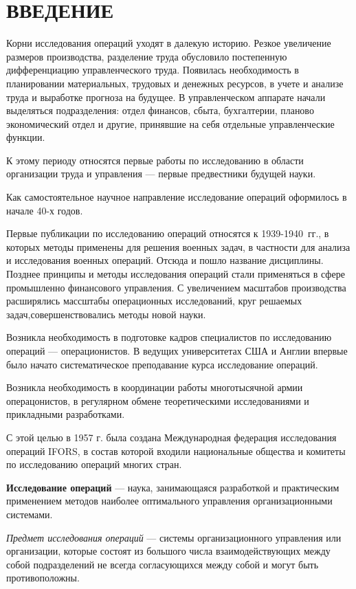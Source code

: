 \section*{ВВЕДЕНИЕ}

Корни исследования операций уходят в далекую историю. Резкое увеличение размеров производства, разделение труда обусловило постепенную дифференциацию управленческого труда. Появилась необходимость в планировании материальных, трудовых и денежных ресурсов, в учете и анализе труда и выработке прогноза на будущее. В управленческом аппарате начали выделяться подразделения: отдел финансов, сбыта, бухгалтерии, планово экономический отдел и другие, принявшие на себя отдельные управленческие функции.

К этому периоду относятся первые работы по исследованию в области
организации труда и управления --- первые предвестники будущей науки.

Как самостоятельное научное направление исследование операций
оформилось в начале 40-х годов.

Первые публикации по исследованию операций относятся к 1939-1940~гг., в
которых методы применены для решения военных задач, в частности для
анализа и исследования военных операций. Отсюда и пошло название
дисциплины. Позднее принципы и методы исследования операций стали
применяться в сфере промышленно финансового управления. С увеличением
масштабов производства расширялись массштабы операционных
исследований, круг решаемых задач,совершенствовались методы новой
науки.

Возникла необходимость в подготовке кадров специалистов по
исследованию операций --- операционистов. В ведущих университетах США и
Англии впервые было начато систематическое преподавание курса
исследование операций.

Возникла необходимость в координации работы многотысячной армии
операцонистов, в регулярном обмене теоретическими исследованиями и
прикладными разработками.

С этой целью в 1957 г. была создана Международная федерация
исследования операций IFORS, в состав которой входили национальные
общества и комитеты по исследованию операций многих стран.

\textbf{Исследование операций} --- наука, занимающаяся разработкой и
практическим применением методов наиболее оптимального управления
организационными системами.

\textsl{Предмет исследования операций} --- системы организационного управления
или организации, которые состоят из большого числа взаимодействующих
между собой подразделений не всегда согласующихся между собой и могут
быть противоположны.

